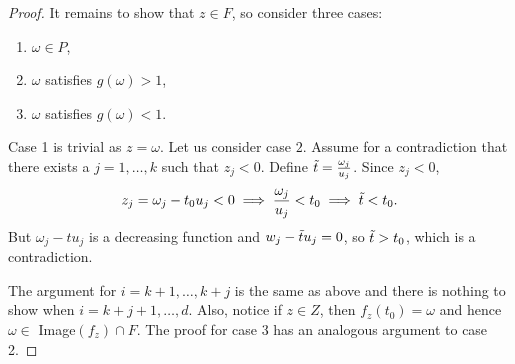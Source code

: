 \documentclass[10pt,a4paper]{amsart}
\begin{document}
\begin{proof}
    It remains to show that $z\in F$, so consider three cases:
    \begin{enumerate}
        \item $\omega\in P$,
        \item $\omega$ satisfies $g(\omega)>1$,
        \item $\omega$ satisfies $g(\omega)<1$.
    \end{enumerate}
    Case 1 is trivial as $z = \omega$. Let us consider case $2$. Assume for a contradiction that there exists a $j = 1,\dots, k$ such that $z_j < 0$. Define $\Tilde{t} = \frac{\omega_j}{u_j}$. Since $z_j < 0$,
    \[z_j = \omega_j - t_0 u_j < 0 \implies \frac{\omega_j}{u_j} < t_0 \implies \Tilde{t} < t_0.\] 
    But $\omega_j - tu_j$ is a decreasing function and $w_j -\Tilde{t}u_j = 0$, so $\Tilde{t}> t_0$, which is a contradiction.
    
    The argument for $i = k+1, \dots, k+j$ is the same as above and there is nothing to show when $i = k+j+1, \dots, d$. Also, notice if $z\in Z$, then $f_z(t_0) = \omega$ and hence $\omega\in$ Image$(f_z)\cap F$. The proof for case 3 has an analogous argument to case 2.
\end{proof}
\end{document}
